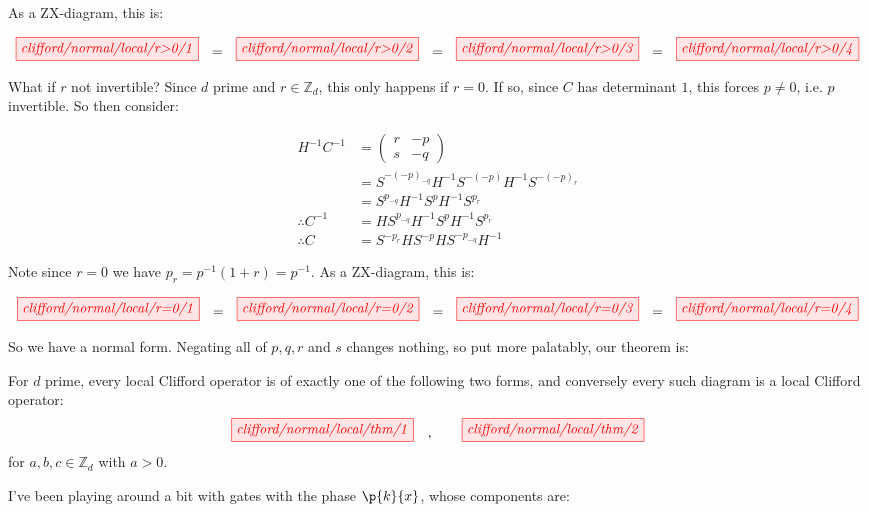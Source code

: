 \documentclass[11pt, oneside]{article}      %
\begin{document}
As a ZX-diagram, this is:

\begin{equation}
	\tikzfig{clifford/normal/local/r>0/1} ~~=~~
	\tikzfig{clifford/normal/local/r>0/2} ~~=~~
	\tikzfig{clifford/normal/local/r>0/3} ~~=~~
	\tikzfig{clifford/normal/local/r>0/4} 
\end{equation}

What if $r$ not invertible? Since $d$ prime and $r \in \mathbb{Z}_d$, this only happens if $r = 0$. If so, since $C$ has determinant $1$, this forces $p \neq 0$, i.e. $p$ invertible. So then consider:

\begin{align*}
	H^{-1}C^{-1}
	&= \begin{pmatrix}
		r & -p \\
		s & -q
	\end{pmatrix} \\
	&= S^{-(-p)_{-q}}H^{-1}S^{-(-p)}H^{-1}S^{-(-p)_r} \\
	&= S^{p_{-q}}H^{-1}S^{p}H^{-1}S^{p_r} \\
	\therefore C^{-1} &= HS^{p_{-q}}H^{-1}S^{p}H^{-1}S^{p_r} \\
	\therefore C &= S^{-p_r}HS^{-p}HS^{-p_{-q}}H^{-1}
\end{align*}

Note since $r=0$ we have $p_r = p^{-1}(1+r) = p^{-1}$. As a ZX-diagram, this is:

\begin{equation}
	\tikzfig{clifford/normal/local/r=0/1} ~~=~~
	\tikzfig{clifford/normal/local/r=0/2} ~~=~~
	\tikzfig{clifford/normal/local/r=0/3} ~~=~~
	\tikzfig{clifford/normal/local/r=0/4} 
\end{equation}

So we have a normal form. Negating all of $p, q, r$ and $s$ changes nothing, so put more palatably, our theorem is:

\begin{theorem}
	For $d$ prime, every local Clifford operator is of exactly one of the following two forms, and conversely every such diagram is a local Clifford operator:
	\begin{equation}
		\tikzfig{clifford/normal/local/thm/1} \quad,\qquad \tikzfig{clifford/normal/local/thm/2}
	\end{equation}
	for $a, b, c \in \mathbb{Z}_d$ with $a > 0$.
\end{theorem}

I've been playing around a bit with gates with the phase $\p{k}{x}$, whose components are:
\end{document}
